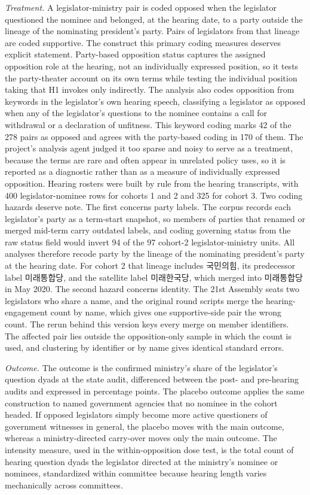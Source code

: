 \documentclass[11pt]{article}
\begin{document}
\textit{Treatment.} A legislator-ministry pair is coded opposed when the legislator questioned the nominee and belonged, at the hearing date, to a party outside the lineage of the nominating president's party. Pairs of legislators from that lineage are coded supportive. The construct this primary coding measures deserves explicit statement. Party-based opposition status captures the assigned opposition role at the hearing, not an individually expressed position, so it tests the party-theater account on its own terms while testing the individual position taking that H1 invokes only indirectly. The analysis also codes opposition from keywords in the legislator's own hearing speech, classifying a legislator as opposed when any of the legislator's questions to the nominee contains a call for withdrawal or a declaration of unfitness. This keyword coding marks 42 of the 278 pairs as opposed and agrees with the party-based coding in 170 of them. The project's analysis agent judged it too sparse and noisy to serve as a treatment, because the terms are rare and often appear in unrelated policy uses, so it is reported as a diagnostic rather than as a measure of individually expressed opposition. Hearing rosters were built by rule from the hearing transcripts, with 400 legislator-nominee rows for cohorts 1 and 2 and 325 for cohort 3. Two coding hazards deserve note. The first concerns party labels. The corpus records each legislator's party as a term-start snapshot, so members of parties that renamed or merged mid-term carry outdated labels, and coding governing status from the raw status field would invert 94 of the 97 cohort-2 legislator-ministry units. All analyses therefore recode party by the lineage of the nominating president's party at the hearing date. For cohort 2 that lineage includes 국민의힘, its predecessor label 미래통합당, and the satellite label 미래한국당, which merged into 미래통합당 in May 2020. The second hazard concerns identity. The 21st Assembly seats two legislators who share a name, and the original round scripts merge the hearing-engagement count by name, which gives one supportive-side pair the wrong count. The rerun behind this version keys every merge on member identifiers. The affected pair lies outside the opposition-only sample in which the count is used, and clustering by identifier or by name gives identical standard errors.

\textit{Outcome.} The outcome is the confirmed ministry's share of the legislator's question dyads at the state audit, differenced between the post- and pre-hearing audits and expressed in percentage points. The placebo outcome applies the same construction to named government agencies that no nominee in the cohort headed. If opposed legislators simply become more active questioners of government witnesses in general, the placebo moves with the main outcome, whereas a ministry-directed carry-over moves only the main outcome. The intensity measure, used in the within-opposition dose test, is the total count of hearing question dyads the legislator directed at the ministry's nominee or nominees, standardized within committee because hearing length varies mechanically across committees.
\end{document}

